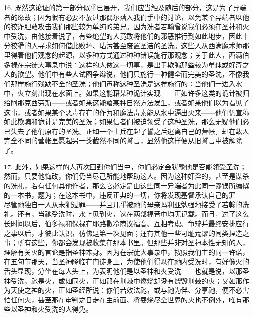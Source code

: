 16. 既然这论证的第一部分似乎已展开，我们应当触及随后的部分，这是为了异端者的缘故；因为很有必要不放过那偶尔落入我们手中的讨论，以免某个异端者以他的狡诈胆敢攻击我们那些较为单纯的弟兄。因为洗者若翰曾说我们必须在圣神和火中受洗，由他接着说了，有些绝望的人竟敢将他们的邪恶推行到如此地步，因此十分狡猾的人寻求如何借此败坏、玷污甚至废置圣洁的圣洗。这些人从西满魔术师那里得着他们观念的起源，以多种方式通过种种错误施行那观念；关于此人，西满伯多禄在宗徒大事录中说：这样的人做这一切事，是出于欺骗那些较为单纯或好奇之人的欲望。他们中有些人试图争辩说，他们只施行一种健全而完美的圣洗，不像我们那样施行残缺不全的圣洗；他们声称这种圣洗是这样施行的：当他们一进入水中，火立刻出现在水面上。如果这能藉某种诡计实现——正如许多这类的诡计被归给阿那克西劳斯——或者如果这能藉某种自然方法发生，或者如果他们以为看见了这事，或者如果某个恶毒存在的作为和魔法毒素能从水中逼出火来——他们仍宣称如此欺骗和诡计是完美的圣洗；如果信者们被迫领受了这种圣洗，那么无疑他们必已失去了他们原有的圣洗。正如一个士兵在起了誓之后逃离自己的营帐，却在敌人完全不同的营帐里愿起另一类截然不同的誓言，显然他这样便从旧誓言中被解除了。\par

17. 此外，如果这样的人再次回到你们当中，你们必定会犹豫他是否能领受圣洗；然而，只要他悔改，你们仍当尽己所能地帮助这人。因为这种奸淫的，甚至是谋杀的洗礼，若有任何其他作者，那么它必定是由这些同一异端者为此同一谬误所编撰的一本书，题为；在这本书中，违反正典的一切，你将发现基督承认自己的罪——尽管祂独自一人从未犯过罪——并且几乎被祂的母亲玛利亚勉强地接受了若翰的洗礼。还有，当祂受洗时，水上见到火，这在两部福音中均无记载。而且，过了这么长时间以后，伯多禄和保禄在耶路撒冷商议福音、互相考虑、争辩并最终安排应行之事以后，才彼此认识，仿佛是第一次见面；还有其他一些可耻荒谬的同类捏造之事；所有这些，你都会发现被收集在那本书里。但那些并非对圣神本性无知的人，理解有关火的言论是指圣神本身。因为在宗徒大事录中，按照我们主的同一许诺，在五旬节那天，当圣神降临在门徒身上，为使他们得以在祂内受洗时，有好像火的舌头显现，分坐在每人头上，为表明他们是以圣神和火受洗——也就是说，以那圣神受洗，祂是火，或如同火，正如那在荆棘中燃烧却没有烧毁荆棘的火；又如那作为天使之神的火，正如圣经所说：你们若效法祂，或与祂为伴、分享祂，便不必害怕任何火，甚至那在审判之日走在主前面、将要烧尽全世界的火也不例外，唯有那些以圣神和火受洗的人得免。\par

